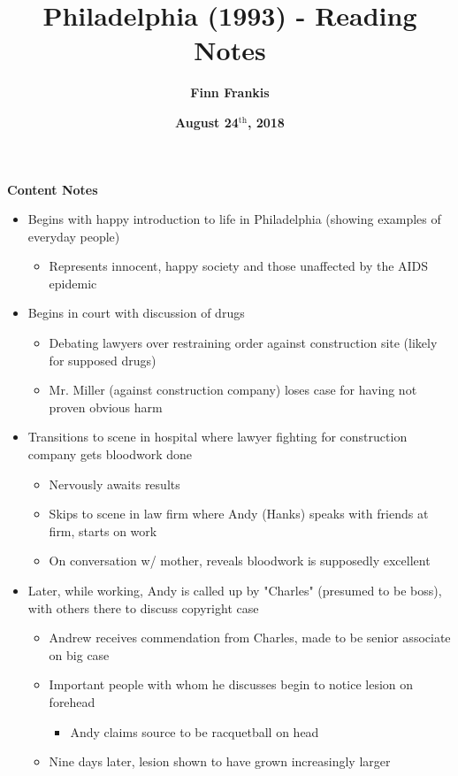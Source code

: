 \documentclass{article}
\title{\textbf{Philadelphia (1993) - Reading Notes}}
\author{\textbf{Finn Frankis}}
\date{\textbf{August 24$^\text{th}$, 2018}}
\begin{document}
    \maketitle
    \textbf{Content Notes}
    \begin{itemize}
        \item Begins with happy introduction to life in Philadelphia (showing examples of everyday people)
        \begin{itemize}
            \item Represents innocent, happy society and those unaffected by the AIDS epidemic
        \end{itemize}
        \item Begins in court with discussion of drugs
        \begin{itemize}
            \item Debating lawyers over restraining order against construction site (likely for supposed drugs)
            \item Mr. Miller (against construction company) loses case for having not proven obvious harm
        \end{itemize}
        \item Transitions to scene in hospital where lawyer fighting for construction company gets bloodwork done
        \begin{itemize}
            \item Nervously awaits results
            \item Skips to scene in law firm where Andy (Hanks) speaks with friends at firm, starts on work
            \item On conversation w/ mother, reveals bloodwork is supposedly excellent
        \end{itemize}
        \item Later, while working, Andy is called up by "Charles" (presumed to be boss), with others there to discuss copyright case 
        \begin{itemize}
            \item Andrew receives commendation from Charles, made to be senior associate on big case
            \item Important people with whom he discusses begin to notice lesion on forehead
            \begin{itemize}
                \item Andy claims source to be racquetball on head
            \end{itemize}
            \item Nine days later, lesion shown to have grown increasingly larger

\end{itemize}
\end{itemize}
\end{document}

